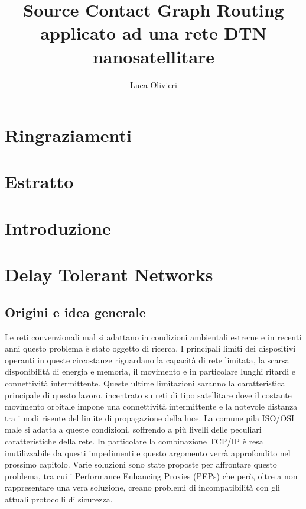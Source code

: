\documentclass[12pt,a4paper,oneside]{book}
\author{Luca Olivieri}
\title{Source Contact Graph Routing applicato ad una rete DTN nanosatellitare}
\begin{document}
	
	
	
	\clearpage
	
	\chapter*{Ringraziamenti}	
	
	\clearpage
	
	\chapter*{Estratto}
	
	\clearpage
	
	\tableofcontents
	
	\clearpage
	
	\chapter{Introduzione}
	
	\clearpage
	
	\chapter{Delay Tolerant Networks}
		
		\section{Origini e idea generale}
		
		Le reti convenzionali mal si adattano in condizioni ambientali estreme e in recenti anni questo problema è stato oggetto di ricerca. I principali limiti dei dispositivi operanti in queste circostanze riguardano la capacità di rete limitata, la scarsa disponibilità di energia e memoria, il movimento e in particolare lunghi ritardi e connettività intermittente. Queste ultime limitazioni saranno la caratteristica principale di questo lavoro, incentrato su reti di tipo satellitare dove il costante movimento orbitale impone una connettività intermittente e la notevole distanza tra i nodi risente del limite di propagazione della luce. La comune pila ISO/OSI male si adatta a queste condizioni, soffrendo a più livelli delle peculiari caratteristiche della rete. In particolare la combinazione TCP/IP è resa inutilizzabile da questi impedimenti e questo argomento verrà approfondito nel prossimo capitolo. Varie soluzioni sono state proposte per affrontare questo problema, tra cui i Performance Enhancing Proxies (PEPs) che però, oltre a non rappresentare una vera soluzione, creano problemi di incompatibilità con gli attuali protocolli di sicurezza.
		
\end{document}
